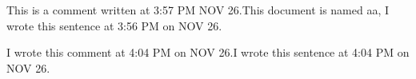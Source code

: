 {This is a comment written at 3:57 PM NOV 26.}This document is named aa,
I wrote this sentence at 3:56 PM on NOV 26.{}

{I wrote this comment at 4:04 PM on NOV 26.}I wrote this sentence at
4:04 PM on NOV 26.{}

